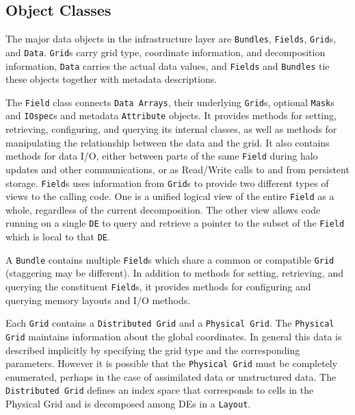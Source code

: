 \subsection{Object Classes}

The major data objects in the infrastructure layer are {\tt Bundles},
{\tt Fields}, {\tt Grid}s, and {\tt Data}.
{\tt Grid}s carry grid type, coordinate information,
and decomposition information, {\tt Data} carries the actual
data values, and {\tt Fields} and {\tt Bundles} tie these objects 
together with metadata descriptions.

The {\tt Field} class connects {\tt Data Arrays}, their underlying
{\tt Grid}s, optional {\tt Mask}s and {\tt IOspec}s and metadata 
{\tt Attribute} objects.  It provides methods
for setting, retrieving, configuring, and querying its internal classes,
as well as methods for manipulating the relationship between the
data and the grid.  It also contains methods for data I/O, either
between parts of the same {\tt Field} during halo updates and other
communications, or as 
Read/Write calls to and from persistent storage.
{\tt Field}s uses information from {\tt Grid}s to provide
two different types of views to the calling code.
One is a unified logical view of the entire {\tt Field} as a whole,
regardless of the current decomposition.  The other view allows code
running on a single {\tt DE} to query and retrieve a pointer 
to the subset of the {\tt Field} which is local to that {\tt DE}.

A {\tt Bundle} contains multiple {\tt Field}s which share a
common or compatible {\tt Grid} (staggering may be different).  In 
addition to methods for
setting, retrieving, and querying the constituent {\tt Field}s, it provides
methods for configuring and querying memory layouts and I/O methods.

Each {\tt Grid} contains a {\tt Distributed Grid} and a 
{\tt Physical Grid}.  The {\tt Physical Grid} maintains
information about the global coordinates.  In general this data
is described implicitly by specifying the grid type and the
corresponding parameters.  However it is possible that the
{\tt Physical Grid} must be completely enumerated, perhaps in the
case of assimilated data or unstructured data.
The {\tt Distributed Grid} defines an index space that corresponds to
cells in the Physical Grid and is decomposed among {DE}s in a 
{\tt Layout}.  


